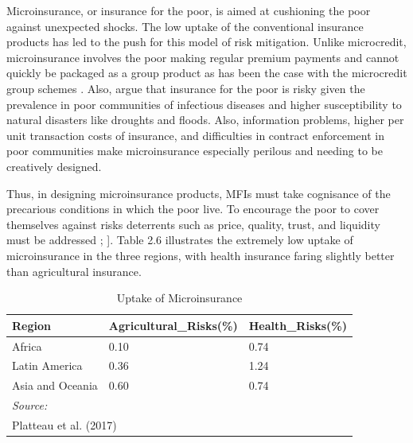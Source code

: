 \documentclass[a4paper, nobind]{templates/ociamthesis}
\begin{document}
Microinsurance, or insurance for the poor, is aimed at cushioning the poor against unexpected shocks. The low uptake of the conventional insurance products has led to the push for this model of risk mitigation. Unlike microcredit, microinsurance involves the poor making regular premium payments and cannot quickly be packaged as a group product as has been the case with the microcredit group schemes \autocite{platteau2017demand}. Also, \textcite{armendariz2010economics} argue that insurance for the poor is risky given the prevalence in poor communities of infectious diseases and higher susceptibility to natural disasters like droughts and floods. Also, information problems, higher per unit transaction costs of insurance, and difficulties in contract enforcement in poor communities make microinsurance especially perilous and needing to be creatively designed.

Thus, in designing microinsurance products, MFIs must take cognisance of the precarious conditions in which the poor live. To encourage the poor to cover themselves against risks deterrents such as price, quality, trust, and liquidity must be addressed \textcite{platteau2017demand}; \textcite{eling2014determinants}{]}. Table 2.6 illustrates the extremely low uptake of microinsurance in the three regions, with health insurance faring slightly better than agricultural insurance.

\begin{table}

\caption{\label{tab:unnamed-chunk-12}Uptake of Microinsurance}
\centering
\fontsize{8}{10}\selectfont
\begin{tabular}[t]{lll}
\toprule
Region & Agricultural\_Risks(\%) & Health\_Risks(\%)\\
\midrule
Africa & 0.10 & 0.74\\
Latin America & 0.36 & 1.24\\
Asia and Oceania & 0.60 & 0.74\\
\bottomrule
\multicolumn{3}{l}{\rule{0pt}{1em}\textit{Source: }}\\
\multicolumn{3}{l}{\rule{0pt}{1em}Platteau et al. (2017)}\\
\end{tabular}
\end{table}
\end{document}
